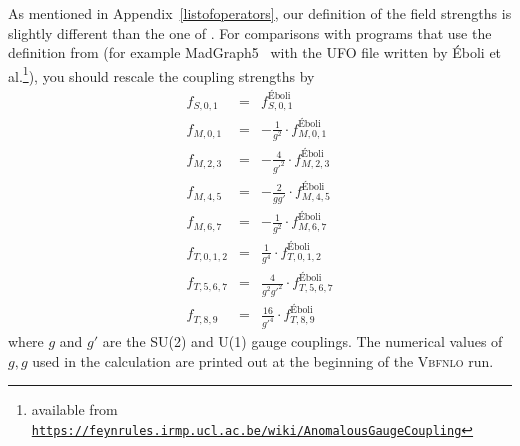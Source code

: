 \documentclass[english,12pt]{article}
\begin{document}
As mentioned in Appendix~\ref{listofoperators}, our definition of the field strengths is
slightly different than the one of \cite{Eboli:2006wa}. For comparisons with
programs that use the definition from \cite{Eboli:2006wa} (for example MadGraph5~\cite{Alwall:2011uj} with
the UFO file written by \'Eboli et 
al.\footnote{available from \tt \url{https://feynrules.irmp.ucl.ac.be/wiki/AnomalousGaugeCoupling}}), 
you should rescale the coupling strengths by
\begin{eqnarray}
 f_{S,0,1}   &=&                            f_{S,0,1}^\textrm{\'Eboli}  \\
 f_{M,0,1}   &=& - \frac{1}{g^2}      \cdot f_{M,0,1}^\textrm{\'Eboli}  \\
 f_{M,2,3}   &=& - \frac{4}{g'^2}     \cdot f_{M,2,3}^\textrm{\'Eboli}  \\
 f_{M,4,5}   &=& - \frac{2}{g g'}     \cdot f_{M,4,5}^\textrm{\'Eboli}  \\
 f_{M,6,7}   &=& - \frac{1}{g^2}      \cdot f_{M,6,7}^\textrm{\'Eboli}  \\
 f_{T,0,1,2} &=&   \frac{1}{g^4}      \cdot f_{T,0,1,2}^\textrm{\'Eboli}\\
 f_{T,5,6,7} &=&   \frac{4}{g^2 g'^2} \cdot f_{T,5,6,7}^\textrm{\'Eboli}\\
 f_{T,8,9}   &=&   \frac{16}{g'^4}    \cdot f_{T,8,9}^\textrm{\'Eboli}
\end{eqnarray}
where $g$ and $g'$ are the SU(2) and U(1) gauge couplings.
The numerical values of $g, g$ used in the calculation are printed out at
the beginning of the \textsc{Vbfnlo} run.


\newpage
\end{document}
